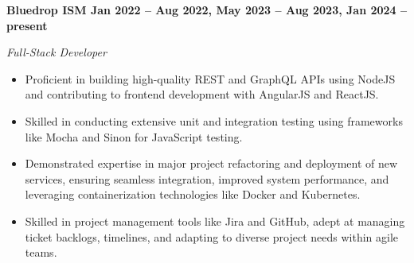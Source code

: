 \vspace{0.1cm}
\textbf{Bluedrop ISM \hfill Jan 2022 -- Aug 2022, May 2023 -- Aug 2023, Jan 2024 -- present} \par
\textit{Full-Stack Developer} \par
\begin{itemize}
	\item Proficient in building high-quality REST and GraphQL APIs using NodeJS and contributing to frontend development with AngularJS and ReactJS.
    \item Skilled in conducting extensive unit and integration testing using frameworks like Mocha and Sinon for JavaScript testing.
    \item Demonstrated expertise in major project refactoring and deployment of new services, ensuring seamless integration, improved system performance, and leveraging containerization technologies like Docker and Kubernetes.
    \item Skilled in project management tools like Jira and GitHub, adept at managing ticket backlogs, timelines, and adapting to diverse project needs within agile teams.
\end{itemize} \par